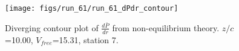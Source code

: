 \begin{figure}[H]
\centering
\texttt{[image: figs/run\_61/run\_61\_dPdr\_contour]}
\caption{Diverging contour plot of $\frac{d\bar{P}}{dr}$ from non-equilibrium theory. $z/c$=10.00, $V_{free}$=15.31, station 7.}
\label{fig:run_61_dPdr_contour}
\end{figure}


